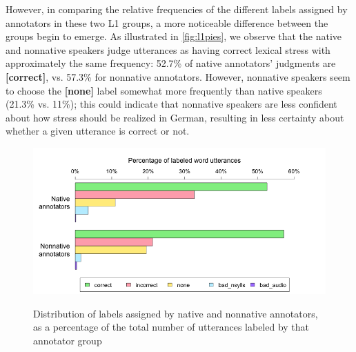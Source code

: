 		However, in comparing the relative frequencies of the different labels assigned by annotators in these two L1 groups, a more noticeable difference between the groups begin to emerge. As illustrated in \cref{fig:l1pies}, we observe that the native and nonnative speakers judge utterances as having correct lexical stress with approximately the same frequency: 52.7\% of native annotators' judgments are \textbf{[correct]}, vs. 57.3\% for nonnative annotators. However, nonnative speakers seem to choose the \textbf{[none]}
		label somewhat more frequently than native speakers (21.3\% vs. 11\%); this could indicate that nonnative speakers are less confident about how stress should be realized in German, resulting in less certainty about whether a given utterance is correct or not. 
		
		
			\begin{figure}[htb]
				\centering
				\caption[Distribution of labels by annotator L1]{Distribution of labels assigned by native and nonnative annotators,
				as a percentage of the total number of utterances labeled by that annotator group
				}
				\includegraphics[width=\textwidth]{img/plots/pctJudgmentsByL1-notStacked}
				\label{fig:agreement:l1bars}
			\end{figure}
			
	
			
